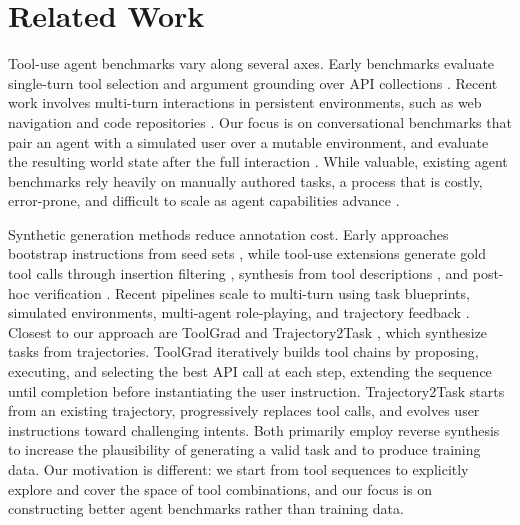\section{Related Work}

Tool-use agent benchmarks vary along several axes. Early benchmarks evaluate single-turn tool selection and argument grounding over API collections \citep{toolllm24qin, bfcl_25_patil, apibank23Li, ToolQA23Zhuang, mcpverse25lei}. Recent work involves multi-turn interactions in persistent environments, such as web navigation and code repositories \citep{webarena_24_zhou, swebench_24_Jimenez}. 
Our focus is on conversational benchmarks that pair an agent with a simulated user over a mutable environment, and evaluate the resulting world state after the full interaction \citep{taubench_24_yao, tau2barres, toolsandbox25lu}. While valuable, existing agent benchmarks rely heavily on manually authored tasks, a process that is costly, error-prone, and difficult to scale as agent capabilities advance \citep{saber2025cuadron, bestpractices2025Zhu, yehudai2026agenticclearautomatingmultilevel}.

Synthetic generation methods reduce annotation cost. Early approaches bootstrap instructions from seed sets \citep{selfinstruct23wang, unnaturalinstructions23honovich, wizardlm24xu}, while tool-use extensions generate gold tool calls through insertion filtering \citep{toolformer23shick}, synthesis from tool descriptions \citep{toolllm24qin, toolalpaca23tang}, and post-hoc verification \citep{apigen24liu}. Recent pipelines scale to multi-turn using task blueprints, simulated environments, multi-agent role-playing, and trajectory feedback \citep{apigenmt25prabhakar, toucan25xu, closetheloop25li, implicitexperience26xu, toolforge25chen, LAM25Hoang}. Closest to our approach are ToolGrad \citep{toolgrad25zhou} and Trajectory2Task \citep{trajectory2task}, which synthesize tasks from trajectories. ToolGrad iteratively builds tool chains by proposing, executing, and selecting the best API call at each step, extending the sequence until completion before instantiating the user instruction. Trajectory2Task starts from an existing trajectory, progressively replaces tool calls, and evolves user instructions toward challenging intents. Both primarily employ reverse synthesis to increase the plausibility of generating a valid task and to produce training data. Our motivation is different: we start from tool sequences to explicitly explore and cover the space of tool combinations, and our focus is on constructing better agent benchmarks rather than training data.

